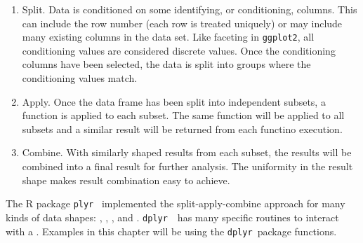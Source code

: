 \documentclass[stat,dissertation]{puthesis}\usepackage[]{graphicx}\usepackage{xcolor}
\newcommand{\pkg}[1]{\texttt{#1}}
\newcommand{\ggplot}{\pkg{ggplot2}}
\begin{document}
\begin{enumerate}
  \item Split.  Data is conditioned on some identifying, or conditioning, columns.  This can include the row number (each row is treated uniquely) or may include many existing columns in the data set.  Like faceting in \ggplot, all conditioning values are considered discrete values.  Once the conditioning columns have been selected, the data is split into groups where the conditioning values match.
  \item Apply.  Once the data frame has been split into independent subsets, a function is applied to each subset.  The same function will be applied to all subsets and a similar result will be returned from each functino execution.
  \item Combine. With similarly shaped results from each subset, the results will be combined into a final result for further analysis.  The uniformity in the result shape makes result combination easy to achieve.
\end{enumerate}

The R package \pkg{plyr}~\cite{plyr} implemented the split-apply-combine approach for many kinds of data shapes: , , , and .  \pkg{dplyr}~\cite{r_dplyr}~has many specific routines to interact with a .  Examples in this chapter will be using the \pkg{dplyr}~package functions.
\end{document}
